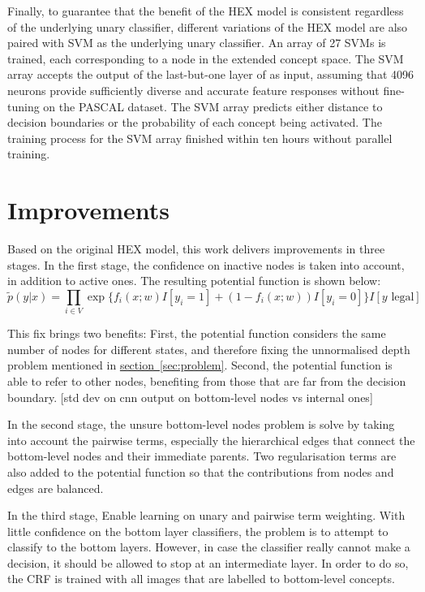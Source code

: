 \documentclass[11pt,a4paper]{article}
\begin{document}
Finally, to guarantee that the benefit of the HEX model is consistent regardless of the underlying unary classifier, different variations of the HEX model are also paired with SVM as the underlying unary classifier. An array of 27 SVMs is trained, each corresponding to a node in the extended concept space. The SVM array accepts the output of the last-but-one layer of \cite{krizhevsky2012imagenet} as input, assuming that 4096 neurons provide sufficiently diverse and accurate feature responses without fine-tuning on the PASCAL dataset. The SVM array predicts either distance to decision boundaries or the probability of each concept being activated. The training process for the SVM array finished within ten hours without parallel training.

\section{Improvements}


Based on the original HEX model, this work delivers improvements in three stages. In the first stage, the confidence on inactive nodes is taken into account, in addition to active ones. The resulting potential function is shown below:
\begin{equation}
\tilde{p}(y|x)=\prod_{i\in V}\exp\{f_i(x;w)I[y_i=1]+(1-f_i(x;w))I[y_i=0]\}I[y\text{ legal}]
\label{eqn:pn}
\end{equation}

This fix brings two benefits: First, the potential function considers the same number of nodes for different states, and therefore fixing the unnormalised depth problem mentioned in \hyperref[sec:problem]{section~\ref{sec:problem}}. Second, the potential function is able to refer to other nodes, benefiting from those that are far from the decision boundary. [std dev on cnn output on bottom-level nodes vs internal ones]

In the second stage, the unsure bottom-level nodes problem is solve by taking into account the pairwise terms, especially the hierarchical edges that connect the bottom-level nodes and their immediate parents. Two regularisation terms are also added to the potential function so that the contributions from nodes and edges are balanced.

In the third stage, Enable learning on unary and pairwise term weighting. With little confidence on the bottom layer classifiers, the problem is to attempt to classify to the bottom layers. However, in case the classifier really cannot make a decision, it should be allowed to stop at an intermediate layer. In order to do so, the CRF is trained with all images that are labelled to bottom-level concepts.
\end{document}
